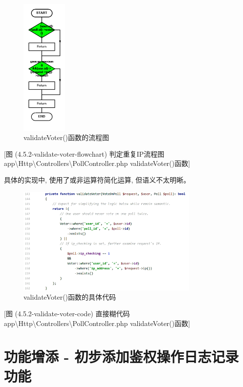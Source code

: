 \begin{figure}[hb]
    \centering
    \includegraphics[width=0.2\textwidth]{support-files/4.5.2-validate-voter-flowchart.png}
    \caption{validateVoter()函数的流程图}
    \label{fig:validatevoterchart}
\end{figure}

[图 (4.5.2-validate-voter-flowchart) 判定重复IP流程图 app\textbackslash Http\textbackslash Controllers\textbackslash PollController.php  validateVoter()函数]

具体的实现中, 使用了或非运算符简化运算, 但语义不太明晰。

\begin{figure}[h]
    \centering
    \includegraphics[width=0.8\textwidth]{support-files/4.5.2-validate-voter-code.png}
    \caption{validateVoter()函数的具体代码}
    \label{fig:validatevotercode}
\end{figure}

[图  (4.5.2-validate-voter-code) 直接糊代码 app\textbackslash Http\textbackslash Controllers\textbackslash PollController.php  validateVoter()函数]


\section{功能增添 - 初步添加鉴权操作日志记录功能}

